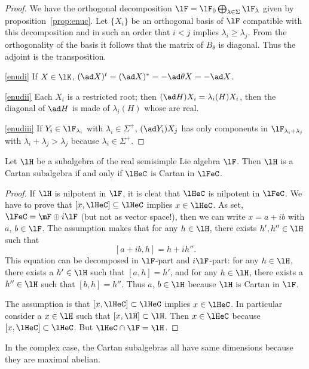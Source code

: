 \begin{proof}
We have the orthogonal decomposition $\lF=\lF_0\bigoplus_{\lambda\in\Sigma}\lF_{\lambda}$ given by proposition~\ref{prop:enuc}. Let $\{X_i\}$ be an orthogonal basis of $\lF$ compatible with this decomposition and in such an order that $i<j$ implies $\lambda_i\geq\lambda_j$. From the orthogonality of the basis it follows that the matrix of $B_{\theta}$ is diagonal. Thus the adjoint is the transposition.

\ref{enudi} If $X\in\lK$, $(\ad X)^t=(\ad X)^*=-\ad\theta X=-\ad X$.

\ref{enudii} Each $X_i$ is a restricted root; then $(\ad H)X_i=\lambda_i(H)X_i$, then the diagonal of $\ad H$ is made of $\lambda_i(H)$ whose are real.

\ref{enudiii} If $Y_i\in\lF_{\lambda_i}$ with $\lambda_i\in\Sigma^+$, $(\ad Y_i)X_j$ has only components in $\lF_{\lambda_i+\lambda_j}$ with $\lambda_i+\lambda_j>\lambda_j$ because $\lambda_i\in\Sigma^+$.
\end{proof}


\begin{lemma}
Let $\lH$ be a subalgebra of the real semisimple Lie algebra $\lF$. Then $\lH$ is a Cartan subalgebra if and only if $\lHeC$ is Cartan in $\lFeC$.
\end{lemma}

\begin{proof}
 If $\lH$ is nilpotent in $\lF$, it is cleat that $\lHeC$ is nilpotent in $\lFeC$. We have to prove that $[x,\lHeC]\subseteq\lHeC$ implies $x\in\lHeC$. As set, $\lFeC=\mF\oplus i\lF$  (but not as vector space!), then we can write $x=a+ib$ with $a$, $b\in\lF$. The assumption makes that for any $h\in\lH$, there exists $h',h''\in\lH$ such that
\[
   [a+ib,h]=h+ih''.
\]
This equation can be decomposed in $\lF$-part and $i\lF$-part: for any $h\in\lH$, there exists a $h'\in\lH$ such that $[a,h]=h'$,  and for any $h\in\lH$, there exists a $h''\in\lH$ such that $[b,h]=h''$. Thus $a$, $b\in\lH$ because $\lH$ is Cartan in $\lF$.

 The assumption is that $[x,\lHeC]\subset\lHeC$ implies $x\in\lHeC$. In particular consider a $x\in\lH$ such that $[x,\lH]\subset\lH$. Then $x\in\lHeC$ because $[x,\lHeC]\subset\lHeC$. But $\lHeC\cap\lF=\lH$.
\end{proof}

In the complex case, the Cartan subalgebras all have same dimensions because they are maximal abelian.
